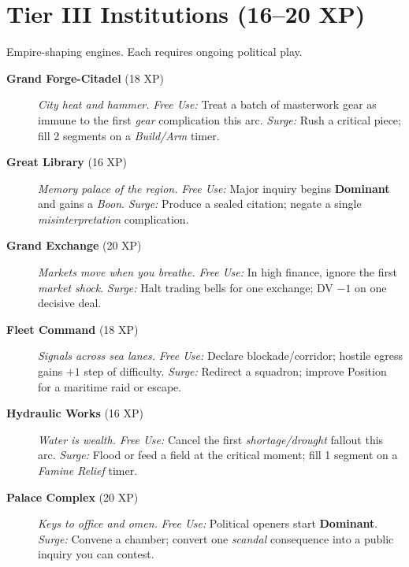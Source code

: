 \section{Tier III Institutions (16--20 XP)}
Empire-shaping engines. Each requires ongoing political play.
\begin{description}
  \item[\textbf{Grand Forge-Citadel} (18 XP)]  \emph{City heat and hammer.} \emph{Free Use:} Treat a batch of masterwork gear as immune to the first \emph{gear} complication this arc. \emph{Surge:} Rush a critical piece; fill 2 segments on a \emph{Build/Arm} timer.

  \item[\textbf{Great Library} (16 XP)]  \emph{Memory palace of the region.} \emph{Free Use:} Major inquiry begins \textbf{Dominant} and gains a \emph{Boon}. \emph{Surge:} Produce a sealed citation; negate a single \emph{misinterpretation} complication.

  \item[\textbf{Grand Exchange} (20 XP)]  \emph{Markets move when you breathe.} \emph{Free Use:} In high finance, ignore the first \emph{market shock}. \emph{Surge:} Halt trading bells for one exchange; DV $-1$ on one decisive deal.

  \item[\textbf{Fleet Command} (18 XP)]  \emph{Signals across sea lanes.} \emph{Free Use:} Declare blockade/corridor; hostile egress gains $+1$ step of difficulty. \emph{Surge:} Redirect a squadron; improve Position for a maritime raid or escape.

  \item[\textbf{Hydraulic Works} (16 XP)]  \emph{Water is wealth.} \emph{Free Use:} Cancel the first \emph{shortage/drought} fallout this arc. \emph{Surge:} Flood or feed a field at the critical moment; fill 1 segment on a \emph{Famine Relief} timer.

  \item[\textbf{Palace Complex} (20 XP)]  \emph{Keys to office and omen.} \emph{Free Use:} Political openers start \textbf{Dominant}. \emph{Surge:} Convene a chamber; convert one \emph{scandal} consequence into a public inquiry you can contest.
\end{description}

